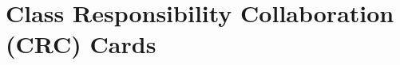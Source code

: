 \section{Class Responsibility Collaboration (CRC) Cards}
\label{sec:crc_cards}

% 


















